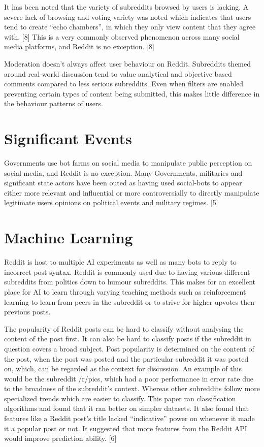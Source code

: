 It has been noted that the variety of subreddits browsed by users is lacking. A severe lack of browsing and voting variety was noted which indicates that users tend to create “echo chambers”, in which they only view content that they agree with. [8] This is a very commonly observed phenomenon across many social media platforms, and Reddit is no exception. [8]

Moderation doesn’t always affect user behaviour on Reddit. Subreddits themed around real-world discussion tend to value analytical and objective based comments compared to less serious subreddits. Even when filters are enabled preventing certain types of content being submitted, this makes little difference in the behaviour patterns of users.

\section{Significant Events}
Governments use bot farms on social media to manipulate public perception on social media, and Reddit is no exception. Many Governments, militaries and significant state actors have been outed as having used social-bots to appear either more relevant and influential or more controversially to directly manipulate legitimate users opinions on political events and military regimes. [5] 

\section{Machine Learning}
Reddit is host to multiple AI experiments as well as many bots to reply to incorrect post syntax. Reddit is commonly used due to having various different subreddits from politics down to humour subreddits. This makes for an excellent place for AI to learn through varying teaching methods such as reinforcement learning to learn from peers in the subreddit or to strive for higher upvotes then previous posts. \cite{1}
	
The popularity of Reddit posts can be hard to classify without analysing the content of the post first. It can also be hard to classify posts if the subreddit in question covers a broad subject. Post popularity is determined on the content of the post, when the post was posted and the particular subreddit it was posted on, which, can be regarded as the context for discussion. An example of this would be the subreddit /r/pics, which had a poor performance in error rate due to the broadness of the subreddit’s context. Whereas other subreddits follow more specialized trends which are easier to classify. This paper ran classification algorithms and found that it ran better on simpler datasets. It also found that features like a Reddit post’s title lacked “indicative” power on whenever it made it a popular post or not. It suggested that more features from the Reddit API would improve prediction ability. [6]

